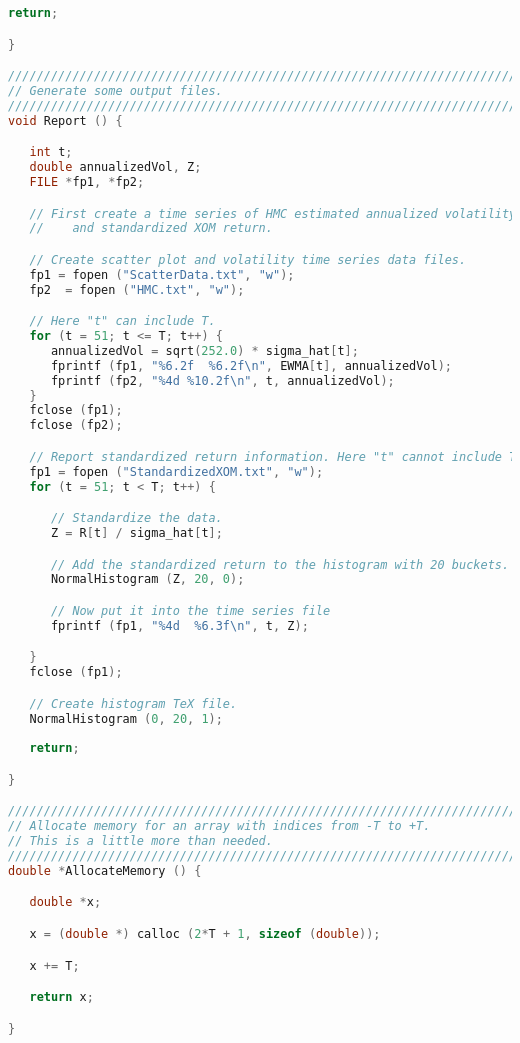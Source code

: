 \documentclass{report}
\begin{document}
\begin{lstlisting}[language=C++]
   return;

}

////////////////////////////////////////////////////////////////////////////////
// Generate some output files.
////////////////////////////////////////////////////////////////////////////////
void Report () {

   int t;
   double annualizedVol, Z;
   FILE *fp1, *fp2;

   // First create a time series of HMC estimated annualized volatility,
   //    and standardized XOM return.

   // Create scatter plot and volatility time series data files.
   fp1 = fopen ("ScatterData.txt", "w");
   fp2  = fopen ("HMC.txt", "w");

   // Here "t" can include T.
   for (t = 51; t <= T; t++) {
      annualizedVol = sqrt(252.0) * sigma_hat[t];
      fprintf (fp1, "%6.2f  %6.2f\n", EWMA[t], annualizedVol);
      fprintf (fp2, "%4d %10.2f\n", t, annualizedVol);
   }
   fclose (fp1);
   fclose (fp2);

   // Report standardized return information. Here "t" cannot include T.
   fp1 = fopen ("StandardizedXOM.txt", "w");
   for (t = 51; t < T; t++) {

      // Standardize the data.
      Z = R[t] / sigma_hat[t];

      // Add the standardized return to the histogram with 20 buckets.
      NormalHistogram (Z, 20, 0);

      // Now put it into the time series file
      fprintf (fp1, "%4d  %6.3f\n", t, Z);

   }
   fclose (fp1);

   // Create histogram TeX file.
   NormalHistogram (0, 20, 1);
 
   return;

}

////////////////////////////////////////////////////////////////////////////////
// Allocate memory for an array with indices from -T to +T.
// This is a little more than needed.
////////////////////////////////////////////////////////////////////////////////
double *AllocateMemory () {

   double *x;

   x = (double *) calloc (2*T + 1, sizeof (double));

   x += T;

   return x;

}

\end{lstlisting}
\end{document}
